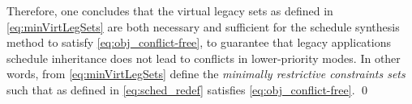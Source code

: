 Therefore, one concludes that the virtual legacy sets \minvirtlegApp{}{} as defined in \eqref{eq:minVirtLegSets} are both necessary and sufficient for the schedule synthesis method to satisfy \eqref{eq:obj_conflict-free}, \ie to guarantee that legacy applications schedule inheritance does not lead to conflicts in lower-priority modes.
In other words, \minvirtlegApp{}{} from \eqref{eq:minVirtLegSets} define the \emph{minimally restrictive constraints sets} such that \sched{} as defined in \eqref{eq:sched_redef} satisfies \eqref{eq:obj_conflict-free}.
\qed
